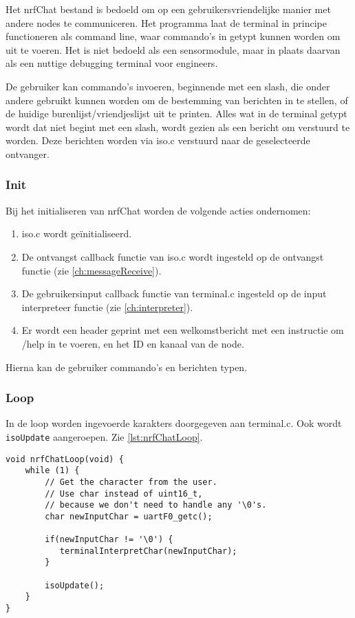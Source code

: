 
Het nrfChat bestand is bedoeld om op een gebruikersvriendelijke manier met andere nodes te communiceren. Het programma laat de terminal in principe functioneren als command line, waar commando's in getypt kunnen worden om uit te voeren. Het is niet bedoeld als een sensormodule, maar in plaats daarvan als een nuttige debugging terminal voor engineers.

De gebruiker kan commando's invoeren, beginnende met een slash, die onder andere gebruikt kunnen worden om de bestemming van berichten in te stellen, of de huidige burenlijst/vriendjeslijst uit te printen. Alles wat in de terminal getypt wordt dat niet begint met een slash, wordt gezien als een bericht om verstuurd te worden. Deze berichten worden via iso.c verstuurd naar de geselecteerde ontvanger.

\subsubsection{Init}
Bij het initialiseren van nrfChat worden de volgende acties ondernomen:
\begin{enumerate}
    \item iso.c wordt geïnitialiseerd. 
    \item De ontvangst callback functie van iso.c wordt ingesteld op de ontvangst functie (zie \autoref{ch:messageReceive}).
    \item De gebruikersinput callback functie van terminal.c ingesteld op de input interpreteer functie (zie \autoref{ch:interpreter}).
    \item Er wordt een header geprint met een welkomstbericht met een instructie om /help in te voeren, en het ID en kanaal van de node.
\end{enumerate}

Hierna kan de gebruiker commando's en berichten typen.

\subsubsection{Loop}
In de loop worden ingevoerde karakters doorgegeven aan terminal.c. Ook wordt \texttt{isoUpdate} aangeroepen. Zie \autoref{lst:nrfChatLoop}.

\begin{lstlisting}[caption={De nrfChat loop},captionpos=b,label={lst:nrfChatLoop},style=c,xleftmargin=.\textwidth,xrightmargin=.\textwidth]
void nrfChatLoop(void) {
    while (1) {
        // Get the character from the user.
        // Use char instead of uint16_t,
        // because we don't need to handle any '\0's.
        char newInputChar = uartF0_getc();

        if(newInputChar != '\0') {
           terminalInterpretChar(newInputChar);
        }

        isoUpdate();
    }
}
\end{lstlisting}


